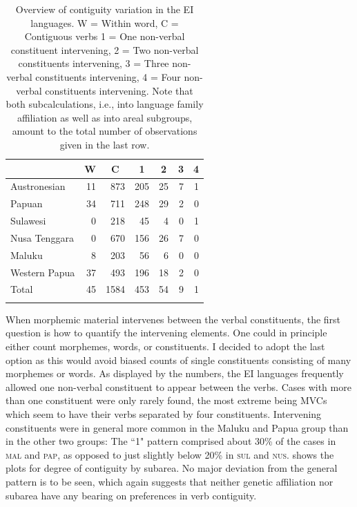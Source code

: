 \begin{table}
\begin{tabular}{lrrrrrr}
  \lsptoprule
 & \multicolumn{1}{c}{W} & \multicolumn{1}{c}{C} & \multicolumn{1}{c}{1} & \multicolumn{1}{c}{2} & \multicolumn{1}{c}{3} & \multicolumn{1}{c}{4} \tabularnewline 
  \midrule
   Austronesian &   11 & 873 & 205 &  25 &  7 & 1 \tabularnewline 
   Papuan &  34 & 711 & 248 &  29 & 2 & 0 \tabularnewline 
   \midrule
   Sulawesi &   0 & 218 &  45 &   4 &   0 &   1 \tabularnewline
   Nusa Tenggara &   0 & 670 & 156 &  26 &   7 &   0 \tabularnewline
   Maluku &   8 &  203 &  56 &  6 &   0 &   0 \tabularnewline 
   Western Papua &  37 & 493 & 196 &  18 &   2 &   0 \tabularnewline 
   \midrule
   Total & 45 & 1584 & 453 & 54 & 9 & 1 \tabularnewline
\lspbottomrule
\end{tabular}
\caption[Contiguity variation in the EI sample]{Overview of contiguity variation in the EI languages. W = Within word, C = Contiguous verbs 1 = One non-verbal constituent intervening, 2 = Two non-verbal constituents intervening, 3 = Three non-verbal constituents intervening, 4 = Four non-verbal constituents intervening. Note that both subcalculations, i.e., into language family affiliation as well as into areal subgroups, amount to the total number of observations given in the last row.}
\label{table:Contiguity_overview}
\end{table}

When morphemic material intervenes between the verbal constituents, the first question is how to quantify the intervening elements. One could in principle either count morphemes, words, or constituents. I decided to adopt the last option as this would avoid biased counts of single constituents consisting of many morphemes or words. As displayed by the numbers, the EI languages frequently allowed one non-verbal constituent to appear between the verbs. Cases with more than one constituent were only rarely found, the most extreme being MVCs which seem to have their verbs separated by four constituents. Intervening constituents were in general more common in the Maluku and Papua group than in the other two groups: The ``1" pattern comprised about 30\% of the cases in  \textsc{mal} and \textsc{pap}, as opposed to just slightly below 20\% in \textsc{sul} and \textsc{nus}.  shows the plots for degree of contiguity by subarea. No major deviation from the general pattern is to be seen, which again suggests that neither genetic affiliation nor subarea have any bearing on preferences in verb contiguity.

